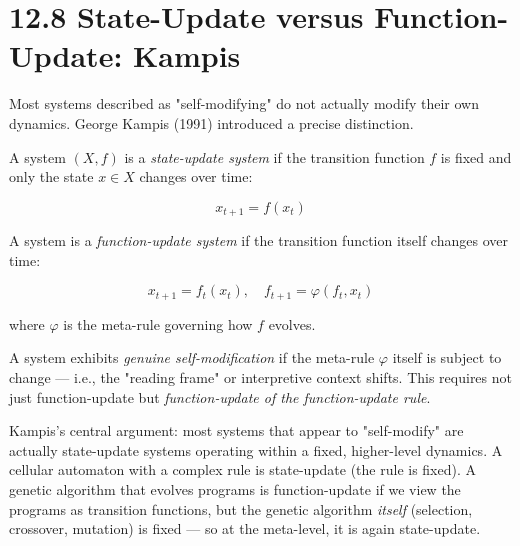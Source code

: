 \section{12.8 State-Update versus Function-Update: Kampis}

Most systems described as "self-modifying" do not actually modify their own dynamics. George Kampis (1991) introduced a precise distinction.

\begin{definition}
A system $(X, f)$ is a \textit{state-update system} if the transition function $f$ is fixed and only the state $x \in X$ changes over time:

\[
x_{t+1} = f(x_t)
\]
\end{definition}

\begin{definition}
A system is a \textit{function-update system} if the transition function itself changes over time:

\[
x_{t+1} = f_t(x_t), \quad f_{t+1} = \varphi(f_t, x_t)
\]

where $\varphi$ is the meta-rule governing how $f$ evolves.
\end{definition}

\begin{definition}
A system exhibits \textit{genuine self-modification} if the meta-rule $\varphi$ itself is subject to change --- i.e., the "reading frame" or interpretive context shifts. This requires not just function-update but \textit{function-update of the function-update rule}.

Kampis's central argument: most systems that appear to "self-modify" are actually state-update systems operating within a fixed, higher-level dynamics. A cellular automaton with a complex rule is state-update (the rule is fixed). A genetic algorithm that evolves programs is function-update if we view the programs as transition functions, but the genetic algorithm \textit{itself} (selection, crossover, mutation) is fixed --- so at the meta-level, it is again state-update.
\end{definition}

